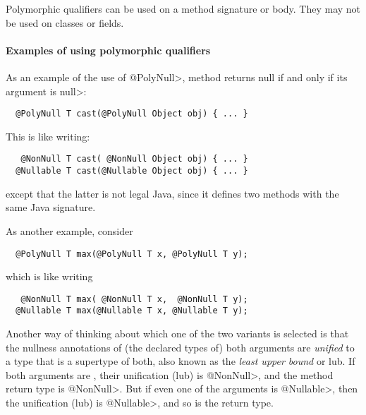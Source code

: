 Polymorphic qualifiers can be used on a method signature or body.
They may not be used on classes or fields.



\paragraph{Examples of using polymorphic qualifiers\label{qualifier-polymorphism-examples}}

As an example of the use of \<@PolyNull>, method 
returns null if and only if its argument is \<null>:

\begin{Verbatim}
  @PolyNull T cast(@PolyNull Object obj) { ... }
\end{Verbatim}

\noindent
This is like writing:

\begin{Verbatim}
   @NonNull T cast( @NonNull Object obj) { ... }
  @Nullable T cast(@Nullable Object obj) { ... }
\end{Verbatim}

\noindent
except that the latter is not legal Java, since it defines two
methods with the same Java signature.


As another example, consider

\begin{Verbatim}
  @PolyNull T max(@PolyNull T x, @PolyNull T y);
\end{Verbatim}

\noindent
which is like writing

\begin{Verbatim}
   @NonNull T max( @NonNull T x,  @NonNull T y);
  @Nullable T max(@Nullable T x, @Nullable T y);
\end{Verbatim}

\noindent
Another way of thinking about which one of the two  variants is
selected is that the nullness annotations of (the declared types of) both
arguments are \emph{unified} to a type that is a supertype of both, also
known as the \emph{least upper bound} or lub.  If both
arguments are , their unification (lub) is \<@NonNull>, and the
method return type is \<@NonNull>.  But if even one of the arguments is \<@Nullable>,
then the unification (lub) is \<@Nullable>, and so is the return type.


